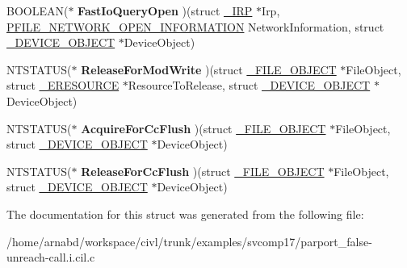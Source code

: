 \begin{DoxyCompactItemize}
\item 
\hypertarget{struct__FAST__IO__DISPATCH_a618d9945b0f67dd1c57f90e0de50e9ce}{}B\+O\+O\+L\+E\+A\+N($\ast$ {\bfseries Fast\+Io\+Query\+Open} )(struct \hyperlink{struct__IRP}{\+\_\+\+I\+R\+P} $\ast$Irp, \hyperlink{struct__FILE__NETWORK__OPEN__INFORMATION}{P\+F\+I\+L\+E\+\_\+\+N\+E\+T\+W\+O\+R\+K\+\_\+\+O\+P\+E\+N\+\_\+\+I\+N\+F\+O\+R\+M\+A\+T\+I\+O\+N} Network\+Information, struct \hyperlink{struct__DEVICE__OBJECT}{\+\_\+\+D\+E\+V\+I\+C\+E\+\_\+\+O\+B\+J\+E\+C\+T} $\ast$Device\+Object)\label{struct__FAST__IO__DISPATCH_a618d9945b0f67dd1c57f90e0de50e9ce}

\item 
\hypertarget{struct__FAST__IO__DISPATCH_a2710635b772ba1e997c442a6833b1be9}{}N\+T\+S\+T\+A\+T\+U\+S($\ast$ {\bfseries Release\+For\+Mod\+Write} )(struct \hyperlink{struct__FILE__OBJECT}{\+\_\+\+F\+I\+L\+E\+\_\+\+O\+B\+J\+E\+C\+T} $\ast$File\+Object, struct \hyperlink{struct__ERESOURCE}{\+\_\+\+E\+R\+E\+S\+O\+U\+R\+C\+E} $\ast$Resource\+To\+Release, struct \hyperlink{struct__DEVICE__OBJECT}{\+\_\+\+D\+E\+V\+I\+C\+E\+\_\+\+O\+B\+J\+E\+C\+T} $\ast$Device\+Object)\label{struct__FAST__IO__DISPATCH_a2710635b772ba1e997c442a6833b1be9}

\item 
\hypertarget{struct__FAST__IO__DISPATCH_a0810f7ede83240c39c9a6cfae426d7f8}{}N\+T\+S\+T\+A\+T\+U\+S($\ast$ {\bfseries Acquire\+For\+Cc\+Flush} )(struct \hyperlink{struct__FILE__OBJECT}{\+\_\+\+F\+I\+L\+E\+\_\+\+O\+B\+J\+E\+C\+T} $\ast$File\+Object, struct \hyperlink{struct__DEVICE__OBJECT}{\+\_\+\+D\+E\+V\+I\+C\+E\+\_\+\+O\+B\+J\+E\+C\+T} $\ast$Device\+Object)\label{struct__FAST__IO__DISPATCH_a0810f7ede83240c39c9a6cfae426d7f8}

\item 
\hypertarget{struct__FAST__IO__DISPATCH_a8151d4e36da00a49457f901b8ac0ccea}{}N\+T\+S\+T\+A\+T\+U\+S($\ast$ {\bfseries Release\+For\+Cc\+Flush} )(struct \hyperlink{struct__FILE__OBJECT}{\+\_\+\+F\+I\+L\+E\+\_\+\+O\+B\+J\+E\+C\+T} $\ast$File\+Object, struct \hyperlink{struct__DEVICE__OBJECT}{\+\_\+\+D\+E\+V\+I\+C\+E\+\_\+\+O\+B\+J\+E\+C\+T} $\ast$Device\+Object)\label{struct__FAST__IO__DISPATCH_a8151d4e36da00a49457f901b8ac0ccea}

\end{DoxyCompactItemize}


The documentation for this struct was generated from the following file\+:\begin{DoxyCompactItemize}
\item 
/home/arnabd/workspace/civl/trunk/examples/svcomp17/parport\+\_\+false-\/unreach-\/call.\+i.\+cil.\+c\end{DoxyCompactItemize}
